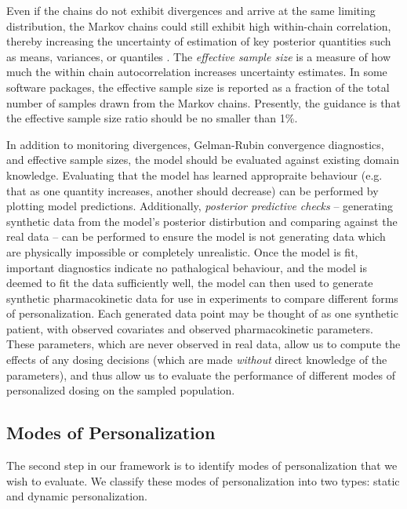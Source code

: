 Even if the chains do not exhibit divergences and arrive at the same limiting distribution, the Markov chains could still exhibit high within-chain correlation, thereby increasing the uncertainty of estimation of key posterior quantities such as means, variances, or quantiles \cite{brooks2011handbook}.  The \textit{effective sample size} is a measure of how much the within chain autocorrelation increases uncertainty estimates.  In some software packages, the effective sample size is reported as a fraction of the total number of samples drawn from the Markov chains.  Presently, the guidance is that the effective sample size ratio should be no smaller than 1\%.



In addition to monitoring divergences, Gelman-Rubin convergence diagnostics, and effective sample sizes, the model should be evaluated against existing domain knowledge.  Evaluating that the model has learned appropraite behaviour (e.g. that as one quantity increases, another should decrease) can be performed by plotting model predictions.  Additionally, \textit{posterior predictive checks} -- generating synthetic data  from the model's posterior distirbution and comparing against the real data -- can be performed to ensure the model is not generating data which are physically impossible or completely unrealistic. Once the model is fit, important diagnostics indicate no pathalogical behaviour, and the model is deemed to fit the data sufficiently well, the model can then used to generate synthetic pharmacokinetic data for use in experiments to compare different forms of personalization. Each generated data point may be thought of as one synthetic patient, with observed covariates and observed pharmacokinetic parameters. These parameters, which are never observed in real data, allow us to compute the effects of any dosing decisions (which are made \textit{without} direct knowledge of the parameters), and thus allow us to evaluate the performance of different modes of personalized dosing on the sampled population. 

\subsection{Modes of Personalization}

The second step in our framework is to identify modes of personalization that we wish to evaluate. We classify these modes of personalization into two types: static and dynamic personalization.

